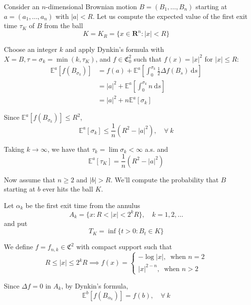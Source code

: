 \begin{example}
    Consider an $n$-dimensional Brownian motion $B = (B_1, \ldots, B_n)$ starting at $a = (a_1, \ldots, a_n)$ with $|a| < R$. Let us compute the expected value of the first exit time $\tau_K$ of $B$ from the ball 
    \[
        K = K_R = \{ x \in \textbf{R}^n : |x| < R \}
    \]

    Choose an integer $k$ and apply Dynkin's formula with $X = B, \tau = \sigma_k = \min(k, \tau_K)$, and $f \in \mathfrak{C}_0^2$ such that $f(x) = |x|^2$ for $|x| \leq R$: 
    \begin{equation*}
        \begin{aligned}
            \mathbb{E}^a [f(B_{\sigma_k})] &= f(a) + \mathbb{E}^a \left[ \int_0^{\sigma_k} \frac{1}{2} \Delta f(B_s)~\mathrm{d}s \right] \\
            &= |a|^2 + \mathbb{E}^a \left[ \int_0^{\sigma_k} n ~\mathrm{d}s \right] \\
            &= |a|^2 + n \mathbb{E}^a[\sigma_k]
        \end{aligned}  
    \end{equation*}

    Since $\mathbb{E}^a [f(B_{\sigma_k})] \leq R^2$, 
    \[
        \mathbb{E}^a[\sigma_k] \leq \frac{1}{n} (R^2 - |a|^2), \quad \forall ~k
    \]

    Taking $k \to \infty$, we have that $\tau_k = \lim \sigma_k < \infty$ a.s. and 
    \[
        \mathbb{E}^a[\tau_K] = \frac{1}{n} (R^2 - |a|^2)
    \]

    Now assume that $n \geq 2$ and $|b| > R$. We'll compute the probability that $B$ starting at $b$ ever hits the ball $K$.

    Let $\alpha_k$ be the first exit time from the annulus 
    \[
        A_k = \{ x : R < |x| < 2^k R \}, \quad k = 1,2,\ldots 
    \]
    and put 
    \[
        T_K = \inf \{ t > 0 : B_t \in K \}
    \]

    We define $f = f_{n,k} \in \mathfrak{C}^2$ with compact support such that 
    \[
        R \leq |x| \leq 2^k R \implies f(x) = \begin{cases}
            - \log |x|, ~\text{ when } n = 2 \\
            |x|^{2-n}, ~\text{ when } n > 2
        \end{cases}
    \]

    Since $\Delta f = 0$ in $A_k$, by Dynkin's formula, 
    \begin{equation}\label{eq:202301261656}
        \mathbb{E}^b[f(B_{\alpha_k})] = f(b), \quad \forall~k
    \end{equation}


\end{example}
